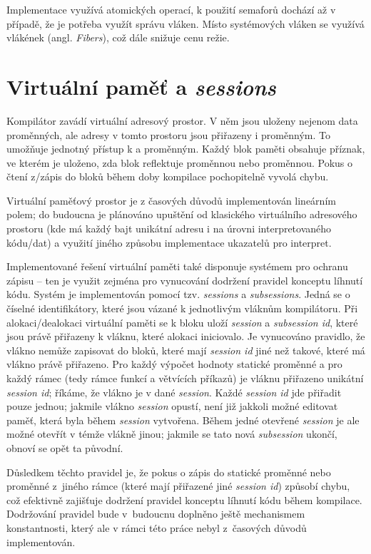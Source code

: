 Implementace využívá atomických operací, k použití semaforů dochází až v případě, že je potřeba využít správu vláken. Místo systémových vláken se využívá vlákének (angl. \textit{Fibers}), což dále snižuje cenu režie.

\section{Virtuální paměť a \textit{sessions}} \label{sec:sessions}
Kompilátor zavádí virtuální adresový prostor. V něm jsou uloženy nejenom data \ctime proměnných, ale  adresy v tomto prostoru jsou přiřazeny i \nonctime proměnným. To umožňuje jednotný přístup k \ctime a \nonctime proměnným. Každý blok paměti obsahuje příznak, ve kterém je uloženo, zda blok reflektuje \ctime proměnnou nebo \nonctime proměnnou. Pokus o čtení z/zápis do \nonctime bloků během doby kompilace pochopitelně vyvolá chybu.

Virtuální paměťový prostor je z časových důvodů implementován lineárním polem; do budoucna je plánováno upuštění od klasického virtuálního adresového prostoru (kde má každý bajt unikátní adresu i na úrovni interpretovaného kódu/dat) a využití jiného způsobu implementace ukazatelů pro interpret.

Implementované řešení virtuální paměti také disponuje systémem pro ochranu zápisu -- ten je využit zejména pro vynucování dodržení pravidel konceptu líhnutí kódu. Systém je implementován pomocí tzv. \textit{sessions} a \textit{subsessions}. Jedná se o číselné identifikátory, které jsou vázané k jednotlivým vláknům kompilátoru. Při alokaci/dealokaci virtuální paměti se k bloku uloží \textit{session} a \textit{subsession id}, které jsou právě přiřazeny k vláknu, které alokaci iniciovalo. Je vynucováno pravidlo, že vlákno nemůže zapisovat do bloků, které mají \textit{session id} jiné než takové, které má vlákno právě přiřazeno. Pro každý výpočet hodnoty statické proměnné a pro každý \nonctime rámec (tedy rámce \nonctime funkcí a větvících příkazů) je vláknu přiřazeno unikátní \textit{session id}; říkáme, že vlákno je v dané \textit{session}. Každé \textit{session id} jde přiřadit pouze jednou; jakmile vlákno \textit{session} opustí, není již jakkoli možné editovat paměť, která byla během \textit{session} vytvořena. Během jedné otevřené \textit{session} je ale možné otevřít v témže vlákně jinou; jakmile se tato nová \textit{subsession} ukončí, obnoví se opět ta původní.

Důsledkem těchto pravidel je, že pokus o zápis do statické proměnné nebo proměnné z~jiného rámce (které mají přiřazené jiné \textit{session id}) způsobí chybu, což efektivně zajišťuje dodržení pravidel konceptu líhnutí kódu během kompilace. Dodržování pravidel bude v~budoucnu doplněno ještě mechanismem konstantnosti, který ale v rámci této práce nebyl z~časových důvodů implementován.

